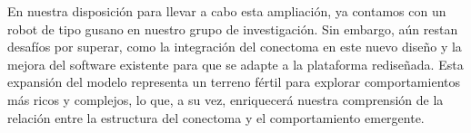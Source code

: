 \begin{itemize}
En nuestra disposición para llevar a cabo esta ampliación, ya contamos con un robot de tipo gusano en nuestro grupo de investigación. Sin embargo, aún restan desafíos por superar, como la integración del conectoma en este nuevo diseño y la mejora del software existente para que se adapte a la plataforma rediseñada. Esta expansión del modelo representa un terreno fértil para explorar comportamientos más ricos y complejos, lo que, a su vez, enriquecerá nuestra comprensión de la relación entre la estructura del conectoma y el comportamiento emergente.


\end{itemize}






